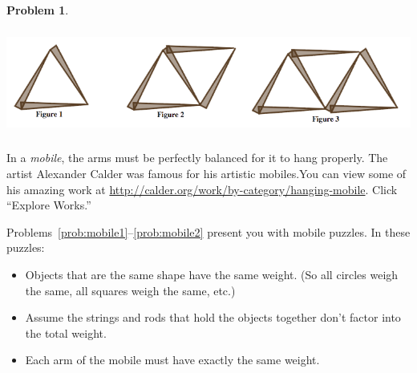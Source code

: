 \documentclass[12pt, reqno]{amsart}
\theoremstyle{remark}
\theoremstyle{definition}
\newtheorem{problem}{Problem}
\numberwithin{equation}{section}  %
\begin{document}
\newpage

\bigskip

\begin{problem}\label{prob:toothpics4}\ 

\begin{center}
\includegraphics[height=3.5cm]{toothpicks3}
\end{center}

\end{problem}

\newpage


In a \emph{mobile}, the arms must be perfectly balanced for it to hang properly.  The artist Alexander Calder was famous for his artistic mobiles.You can view some of his amazing work at \url{http://calder.org/work/by-category/hanging-mobile}.  Click ``Explore Works.''

\bigskip

Problems~\ref{prob:mobile1}--\ref{prob:mobile2} present you with mobile puzzles.     In these puzzles:
\begin{itemize}
\item
Objects that are the same shape have the same weight.  (So all circles weigh the same, all squares weigh the same, etc.) \\
 \item
Assume the strings and rods that hold the objects together don't factor into the total weight.\\
\item
Each arm of the mobile must have exactly the same weight.
\end{itemize}

\bigskip
\bigskip
\bigskip
\end{document}
